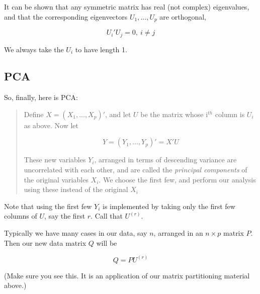 It can be shown that any symmetric matrix has real (not complex)
eigenvalues, and that the corresponding eigenvectors $U_1,...,U_p$
are orthogonal,

\begin{equation}
U_i' U_j = 0, ~ i \neq j
\end{equation}

We always take the $U_i$ to have length 1.

\subsection{PCA}

So, finally, here is PCA:

\begin{quote}

Define $X = (X_1,...,X_p)'$, and let $U$ be the matrix whose i$^{th}$
column is $U_i$ as above.  Now let

\begin{equation}
Y = (Y_1,...,Y_p)' = X'U
\end{equation}

These new variables $Y_i$, arranged in terms of descending variance are
uncorrelated with each other, and are called the \textit{principal
components} of the original variables $X_i$.  We choose the first few,
and perform our analysis using these instead of the original $X_i$

\end{quote}

Note that using the first few $Y_i$ is implemented by taking only the
first few columns of $U$, say the first $r$.  Call that $U^{(r)}$.

Typically we have many cases in our data, say $n$, arranged in an $n
\times p$ matrix $P$.  Then our new data matrix $Q$ will be

\begin{equation}
Q = P U^{(r)}
\end{equation}

(Make sure you see this.  It is an application of our matrix
partitioning material above.)
